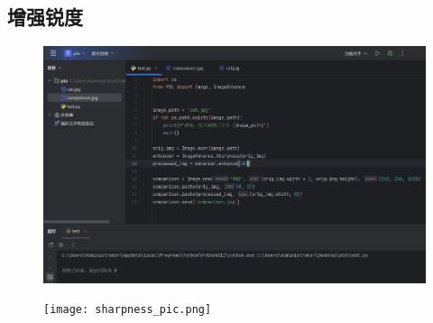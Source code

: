\documentclass{article}
\begin{document}
\subsection{增强锐度}
\begin{figure}[H]
    \centering
    \includegraphics[width=1\linewidth]{sharpness.png}
\end{figure}
\begin{figure}[H]
    \centering
    \texttt{[image: sharpness\_pic.png]}
\end{figure}
\end{document}
